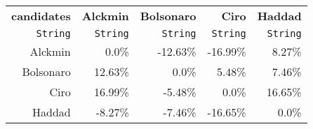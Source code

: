 \begin{table}
  \begin{tabular}{rrrrr}
    \hline\hline
    \textbf{candidates} & \textbf{Alckmin} & \textbf{Bolsonaro} & \textbf{Ciro} & \textbf{Haddad} \\
    \texttt{String} & \texttt{String} & \texttt{String} & \texttt{String} & \texttt{String} \\\hline
    Alckmin & 0.0\% & -12.63\% & -16.99\% & 8.27\% \\
    Bolsonaro & 12.63\% & 0.0\% & 5.48\% & 7.46\% \\
    Ciro & 16.99\% & -5.48\% & 0.0\% & 16.65\% \\
    Haddad & -8.27\% & -7.46\% & -16.65\% & 0.0\% \\\hline\hline
  \end{tabular}
\end{table}
